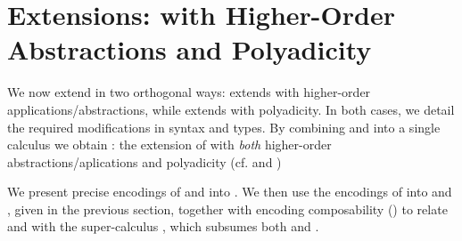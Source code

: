 \documentclass[preprint,11pt]{elsarticle}
\begin{document}
{{%

\section{Extensions: \HOp with Higher-Order Abstractions and Polyadicity}
\label{sec:extension}
%

We now extend \HOp in two orthogonal ways: %
\HOpp  extends   \HOp with higher-order applications/abstractions, while
\PHOp   extends  \HOp
with polyadicity.
In both cases, we detail the
required modifications in syntax and types.
By combining \HOpp and \PHOp into a single calculus we obtain \PHOpp:
the extension of \HOp with \emph{both} higher-order
abstractions/aplications and polyadicity (cf.  and )

We present precise encodings of \HOpp and \PHOp into \HOp.
We then use the encodings of \HOp into \HO and \sessp, given in the previous section, 
together with 
encoding composability () to relate \HO and \sessp with the super-calculus \PHOpp, which subsumes
both \HOpp and \PHOp.


}}
\end{document}
